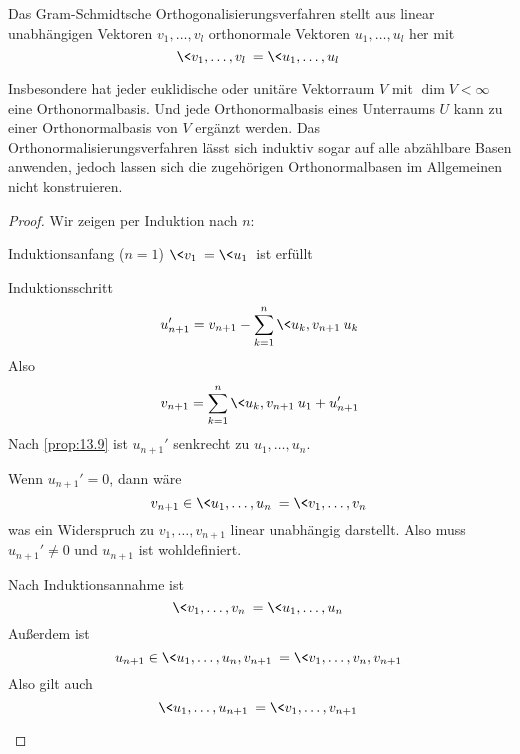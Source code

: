 \documentclass[a4paper, 10pt]{scrbook}
\begin{document}
\begin{thm}
	\label{thm:13.11}
	Das Gram-Schmidtsche Orthogonalisierungsverfahren stellt aus linear unabhängigen Vektoren $v_1,\dotsc,v_l$ orthonormale Vektoren $u_1,\dotsc,u_l$ her mit
	\[
		\<v_1,\dotsc,v_l\> = \<u_1,\dotsc,u_l\>
	\]
	\begin{note}
		Insbesondere hat jeder euklidische oder unitäre Vektorraum $V$ mit $\dim V<\infty$ eine Orthonormalbasis.
		Und jede Orthonormalbasis eines Unterraums $U$ kann zu einer Orthonormalbasis von $V$ ergänzt werden. 
		Das Orthonormalisierungsverfahren lässt sich induktiv sogar auf alle abzählbare Basen anwenden, jedoch lassen
		sich die zugehörigen Orthonormalbasen im Allgemeinen nicht konstruieren.
	\end{note}
	\begin{proof}
		Wir zeigen per Induktion nach $n$:
		\begin{seg}{Induktionsanfang ($n=1$)}
			$\<v_1\> = \<u_1\>$ ist erfüllt
		\end{seg}
		\begin{seg}{Induktionsschritt}
			\[
				u_{n+1}' = v_{n+1}-\sum_{k=1}^n\<u_k,v_{n+1}\>u_k
			\]
			Also
			\[
				v_{n+1} = \sum_{k=1}^n \<u_k,v_{n+1}\>u_1 + u_{n+1}'
			\]
			Nach \ref{prop:13.9} ist $u_{n+1}'$ senkrecht zu $u_1,\dotsc,u_n$.

			Wenn $u_{n+1}' = 0$, dann wäre
			\[
				v_{n+1} \in \<u_1,\dotsc,u_n\> = \<v_1,\dotsc,v_n\>
			\]
			was ein Widerspruch zu $v_1,\dotsc,v_{n+1}$ linear unabhängig darstellt.
			Also muss $u_{n+1}' \neq 0$ und $u_{n+1}$ ist wohldefiniert.

			Nach Induktionsannahme ist
			\[
				\<v_1,\dotsc,v_n\> = \<u_1,\dotsc,u_n\>
			\]
			Außerdem ist
			\[
				u_{n+1}\in \<u_1,\dotsc,u_n,v_{n+1}\>  =\<v_1,\dotsc,v_n,v_{n+1}\>
			\]
			Also gilt auch
			\[
				\<u_1,\dotsc,u_{n+1}\> = \<v_1,\dotsc,v_{n+1}\>
			\]
		\end{seg}
	\end{proof}
\end{thm}
\end{document}
